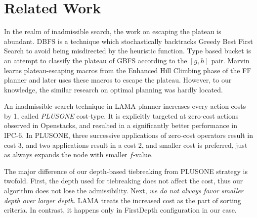 \section{Related Work}
\label{sec-4}

In the realm of inadmissible search, the work on escaping the plateau is
abundant. DBFS \cite{imai2011novel} is a technique which stochastically
backtracks Greedy Best First Search to avoid being misdirected by the
heuristic function. Type based bucket \cite{xie14type} is an attempt to
classify the plateau of GBFS according to the $[g,h]$ pair.
Marvin \cite{Coles07} learns plateau-escaping macros from the Enhanced
Hill Climbing phase of the FF planner \cite{Hoffmann01} and later uses
these macros to escape the plateau.  However, to our knowledge, the
similar research on optimal planning was hardly located.

An inadmissible search technique in LAMA planner \cite{richter2010lama}
increases every action costs by 1, called \emph{PLUSONE} cost-type.
It is explicitly targeted at zero-cost actions observed in Openstacks,
and resulted in a significantly better performance in IPC-6.
In PLUSONE, three successive
applications of zero-cost operators result in cost 3, and two
applications result in a cost 2, and smaller cost is preferred, just as
\astar always expands the node with smaller $f$-value.

The major difference of our depth-based tiebreaking from PLUSONE
strategy is twofold.  First, the depth used for tiebreaking does
not affect the cost, thus our algorithm does not lose the
admissibility. Next, \emph{we do not always favor smaller depth over
larger depth}. LAMA treats the increased cost as the part of
sorting criteria. In contrast, it happens only in FirstDepth configuration in our case.


